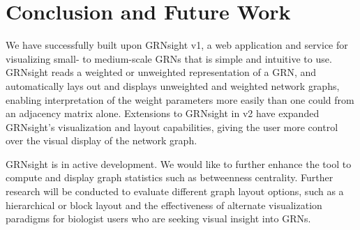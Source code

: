 \documentclass[sigconf,review]{acmart}
\begin{document}
\section{Conclusion and Future Work}
We have successfully built upon GRNsight v1, a web application and service for visualizing small- to medium-scale GRNs that is simple and intuitive to use. GRNsight reads a weighted or unweighted representation of a GRN, and automatically lays out and displays unweighted and weighted network graphs, enabling interpretation of the weight parameters more easily than one could from an adjacency matrix alone. Extensions to GRNsight in v2 have expanded GRNsight's visualization and layout capabilities, giving the user more control over the visual display of the network graph.

GRNsight is in active development. We would like to further enhance the tool to compute and display graph statistics such as betweenness centrality. Further research will be conducted to evaluate different graph layout options, such as a hierarchical or block layout and the effectiveness of alternate visualization paradigms for biologist users who are seeking visual insight into GRNs.


 
\end{document}
